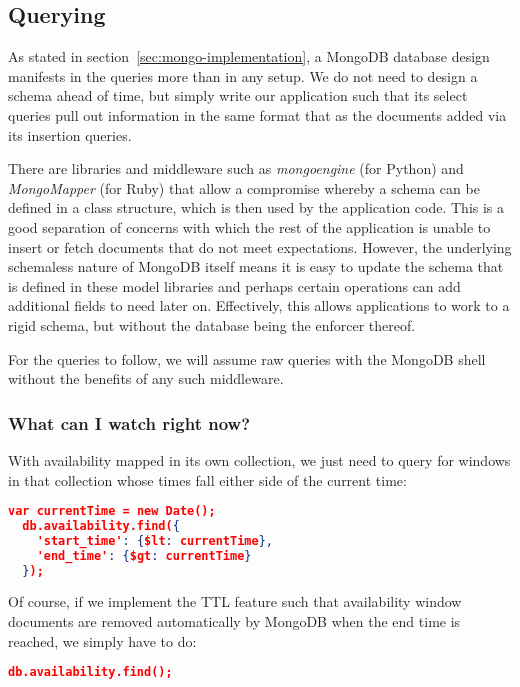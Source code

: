\documentclass[11pt,a4paper]{article}
\begin{document}
\subsection{Querying}
\label{sec:mongo-querying}

As stated in section~\ref{sec:mongo-implementation}, a MongoDB database
design manifests in the queries more than in any setup. We do not need
to design a schema ahead of time, but simply write our application such
that its select queries pull out information in the same format that
as the documents added via its insertion queries.

There are libraries and middleware such as \emph{mongoengine} (for
Python) and \emph{MongoMapper} (for Ruby) that allow a compromise
whereby a schema can be defined in a class structure, which is
then used by the application code. This is a good separation of concerns
with which the rest of the application is unable to insert or fetch
documents that do not meet expectations. However, the underlying
schemaless nature of MongoDB itself means it is easy to update
the schema that is defined in these model libraries and perhaps
certain operations can add additional fields to need later on. Effectively,
this allows applications to work to a rigid schema, but without the
database being the enforcer thereof.

For the queries to follow, we will assume raw queries with the MongoDB
shell without the benefits of any such middleware.

\subsubsection{What can I watch right now?}

With availability mapped in its own collection, we just need to query
for windows in that collection whose times fall either side of the
current time:

\begin{lstlisting}[language=json]
  var currentTime = new Date();
  db.availability.find({
    'start_time': {$lt: currentTime},
    'end_time': {$gt: currentTime}
  });
\end{lstlisting}

Of course, if we implement the TTL feature such that availability
window documents are removed automatically by MongoDB when the end time
is reached, we simply have to do:

\begin{lstlisting}[language=json]
  db.availability.find();
\end{lstlisting}
\end{document}
